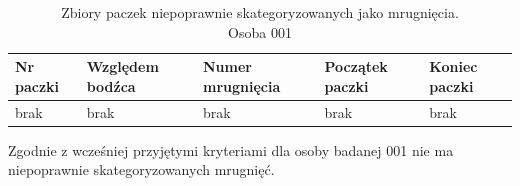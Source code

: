 \documentclass{article}
\begin{document}
            \begin{table}[H]
                \captionsetup{justification=centering}
                \caption {Zbiory paczek niepoprawnie skategoryzowanych jako mrugnięcia. \\Osoba 001}
                \begin{center}
                    \begin{tabular}{| p{1cm} | p{1.75cm} | p{1.75cm} | p{1.75cm} | p{1.75cm} |}
                        \hline
                        Nr paczki & Względem bodźca & Numer mrugnięcia & Początek paczki & Koniec paczki \\
                        \hline
                        \hline
                        brak & brak & brak & brak & brak \\ 
                        \hline
                    \end{tabular}
                \end{center}
            \end{table}

            Zgodnie z wcześniej przyjętymi kryteriami dla osoby badanej 001 nie ma niepoprawnie skategoryzowanych mrugnięć.

        \newpage
\end{document}
